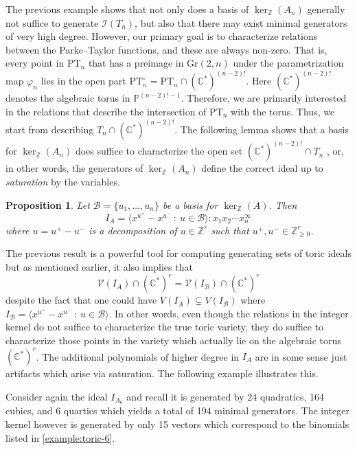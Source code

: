 \documentclass[12pt, reqno]{amsart}
\numberwithin{equation}{section}
\theoremstyle{plain}
\newtheorem{proposition}[theorem]{Proposition}
\theoremstyle{definition}
\newenvironment{example}
  {\pushQED{\qed}\renewcommand{\qedsymbol}{$\triangle$}\examplex}
  {\popQED\endexamplex}
\newcommand{\zz}{\mathbb{Z}}
\newcommand{\ci}{\mathcal{I}}
\newcommand{\cv}{\mathcal{V}}
\begin{document}
The previous example shows that not only does a basis of $\ker_\zz(A_n)$ generally not suffice to generate $\ci(T_n)$, but also that there may exist minimal generators of very high degree. However, our primary goal is to characterize relations between the Parke--Taylor functions, and these are always non-zero. That is, every point in $\mathrm{PT}_n$ that has a preimage in $\mathrm{Gr}(2,n)$ under the parametrization map $\varphi_n$ lies in the open part $\mathrm{PT}^\circ_n=\mathrm{PT}_n\cap(\mathbb{C}^*)^{(n-2)!}$. Here $(\mathbb{C}^*)^{(n-2)!}$ denotes the algebraic torus in $\mathbb{P}^{(n-2)!-1}$. Therefore, we are primarily interested in the relations that describe the intersection of $\mathrm{PT}_n$ with the torus. Thus, we start from describing $T_n\cap(\mathbb{C}^*)^{(n-2)!}$. The following lemma shows that a basis for $\ker_\zz(A_n)$ does suffice to characterize the open set $(\mathbb{C}^\ast)^{(n-2)!} \cap T_n$ , or, in other words, the generators of $\ker_\zz(A_n)$ define the correct ideal up to \emph{saturation} by the variables. 

\begin{proposition}\cite[Lemma 12.2]{sturmfels1996groebner}
Let $\mathcal{B} = \{u_1, \ldots, u_n\}$ be a basis for $\ker_\zz(A)$. Then
\[
I_A = \langle x^{u^+} - x^{u^-} ~:~ u \in \mathcal{B} \rangle : x_1x_2 \cdots x_n^\infty
\]
where $u = u^+ - u^-$ is a decomposition of $u \in \zz^r$ such that $u^+, u^- \in \zz_{\geq 0}^r$. 
\end{proposition}

The previous result is a powerful tool for computing generating sets of toric ideals \cite{hosten1995grin} but as mentioned earlier, it also implies that
\[
\cv(I_A) \cap (\mathbb{C}^\ast)^r = \cv(I_\mathcal{B}) \cap (\mathbb{C}^\ast)^r
\]
despite the fact that one could have $V(I_A) \subsetneq V(I_\mathcal{B})$ where $I_\mathcal{B} = \langle x^{u^+} - x^{u^-} ~:~ u \in \mathcal{B} \rangle$. In other words, even though the relations in the integer kernel do not suffice to characterize the true toric variety, they do suffice to characterize those points in the variety which actually lie on the algebraic torus $(\mathbb{C}^\ast)^r$. The additional polynomials of higher degree in $I_A$ are in some sense just artifacts which arise via saturation. The following example illustrates this. 

\begin{example}
Consider again the ideal $I_{A_6}$ and recall it is generated by 24 quadratics, 164 cubics, and 6 quartics which yields a total of 194 minimal generators. The integer kernel however is generated by only 15 vectors which correspond to the binomials listed in \cref{example:toric-6}. 
\end{example}
\end{document}
